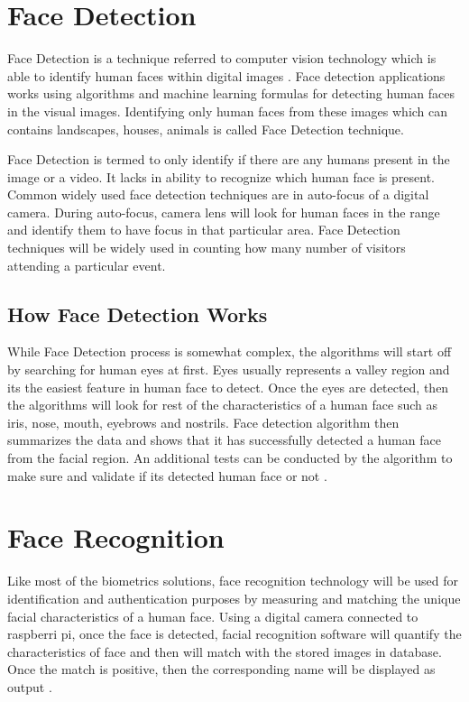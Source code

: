 \documentclass[sigconf]{acmart}
\begin{document}
\section{Face Detection}
Face Detection is a technique referred to computer vision technology which is able to identify human faces within digital images \cite{divya2013}. Face detection applications works using algorithms and machine learning formulas for detecting human faces in the visual images. Identifying only human faces from these images which can contains landscapes, houses, animals is called Face Detection technique.

Face Detection is termed to only identify if there are any humans present in the image or a video. It lacks in ability to recognize which human face is present. Common widely used face detection techniques are in auto-focus of a digital camera. During auto-focus, camera lens will look for human faces in the range and identify them to have focus in that particular area.
Face Detection techniques will be widely used in counting how many number of visitors attending a particular event.

\subsection{How Face Detection Works}
While Face Detection process is somewhat complex, the algorithms will start off by searching for human eyes at first. Eyes usually represents a valley region and its the easiest feature in human face to detect. Once the eyes are detected, then the algorithms will look for rest of the characteristics of a human face such as iris, nose, mouth, eyebrows and nostrils. Face detection algorithm then summarizes the data and shows that it has successfully detected a human face from the facial region. An additional tests can be conducted by the algorithm to make sure and validate if its detected human face or not \cite{jesse2017}.

\section{Face Recognition}
Like most of the biometrics solutions, face recognition technology will be used for identification and authentication purposes by measuring and matching the unique facial characteristics of a human face. Using a digital camera connected to raspberri pi, once the face is detected, facial recognition software will quantify the characteristics of face and then will match with the stored images in database. Once the match is positive, then the corresponding name will be displayed as output \cite{biometrics2016}.
\end{document}
